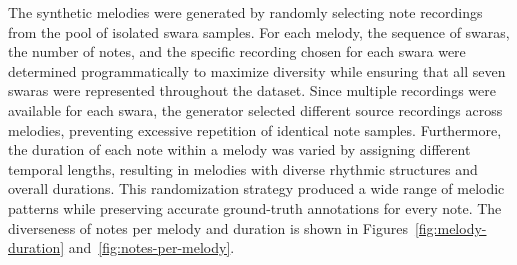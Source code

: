 \begin{table}[H]
\centering
\caption{Synthetic melody dataset (sample)}
\label{tab:synthetic-melody}
\end{table}

The synthetic melodies were generated by randomly selecting note recordings from the pool of isolated swara samples. For each melody, the sequence of swaras, the number of notes, and the specific recording chosen for each swara were determined programmatically to maximize diversity while ensuring that all seven swaras were represented throughout the dataset. Since multiple recordings were available for each swara, the generator selected different source recordings across melodies, preventing excessive repetition of identical note samples. Furthermore, the duration of each note within a melody was varied by assigning different temporal lengths, resulting in melodies with diverse rhythmic structures and overall durations. This randomization strategy produced a wide range of melodic patterns while preserving accurate ground-truth annotations for every note. The diverseness of notes per melody and duration is shown in Figures~\ref{fig:melody-duration} and~\ref{fig:notes-per-melody}.


